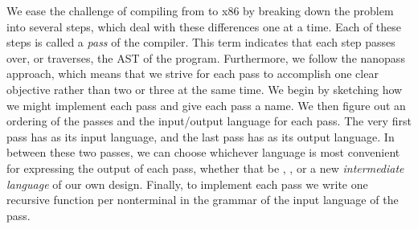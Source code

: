 \documentclass[7x10]{TimesAPriori_MIT}%
\numberwithin{theorem}{chapter}
\numberwithin{definition}{chapter}
\numberwithin{equation}{chapter}
\begin{document}
We ease the challenge of compiling from \LangVar{} to x86 by breaking
down the problem into several steps, which deal with these differences
one at a time. Each of these steps is called a \emph{pass} of the
compiler.
%
This term indicates that each step passes over, or traverses, the AST
of the program.
%
Furthermore, we follow the nanopass approach, which means that we
strive for each pass to accomplish one clear objective rather than two
or three at the same time.
%
We begin by sketching how we might implement each pass and give each
pass a name.  We then figure out an ordering of the passes and the
input/output language for each pass. The very first pass has
\LangVar{} as its input language, and the last pass has \LangXInt{} as
its output language. In between these two passes, we can choose
whichever language is most convenient for expressing the output of
each pass, whether that be \LangVar{}, \LangXInt{}, or a new
\emph{intermediate language} of our own design.  Finally, to
implement each pass we write one recursive function per nonterminal in
the grammar of the input language of the pass.
\end{document}

